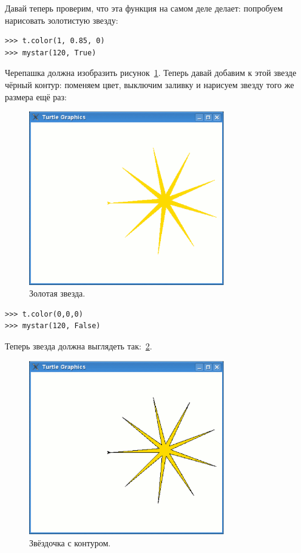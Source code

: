 Давай теперь проверим, что эта функция на самом деле делает: попробуем нарисовать золотистую звезду:

\begin{listing}
\begin{verbatim}
>>> t.color(1, 0.85, 0)
>>> mystar(120, True)
\end{verbatim}
\end{listing}

Черепашка должна изобразить рисунок \ref{fig29}. Теперь давай добавим к этой звезде чёрный контур: поменяем цвет, выключим заливку и нарисуем звезду того же размера ещё раз:

\begin{figure}
\begin{center}
\includegraphics[width=85mm]{../en/figure29.eps}
\end{center}
\caption{Золотая звезда.}\label{fig29}
\end{figure}

\begin{listing}
\begin{verbatim}
>>> t.color(0,0,0)
>>> mystar(120, False)
\end{verbatim}
\end{listing}

Теперь звезда должна выглядеть так: \ref{fig30}.

\begin{figure}
\begin{center}
\includegraphics[width=85mm]{../en/figure30.eps}
\end{center}
\caption{Звёздочка с контуром.}\label{fig30}
\end{figure}

